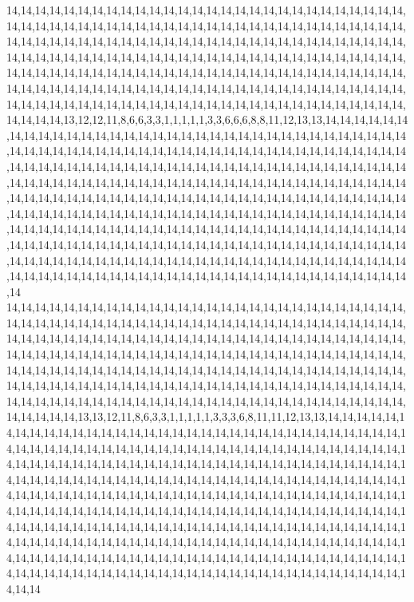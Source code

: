 14,14,14,14,14,14,14,14,14,14,14,14,14,14,14,14,14,14,14,14,14,14,14,14,14,14,14,14,14,14,14,14,14,14,14,14,14,14,14,14,14,14,14,14,14,14,14,14,14,14,14,14,14,14,14,14,14,14,14,14,14,14,14,14,14,14,14,14,14,14,14,14,14,14,14,14,14,14,14,14,14,14,14,14,14,14,14,14,14,14,14,14,14,14,14,14,14,14,14,14,14,14,14,14,14,14,14,14,14,14,14,14,14,14,14,14,14,14,14,14,14,14,14,14,14,14,14,14,14,14,14,14,14,14,14,14,14,14,14,14,14,14,14,14,14,14,14,14,14,14,14,14,14,14,14,14,14,14,14,14,14,14,14,14,14,14,14,14,14,14,14,14,14,14,14,14,14,14,14,14,14,14,14,14,14,14,14,14,14,14,14,14,14,14,14,14,14,14,14,14,13,12,12,11,8,6,6,3,3,1,1,1,1,1,3,3,6,6,6,8,8,11,12,13,13,14,14,14,14,14,14,14,14,14,14,14,14,14,14,14,14,14,14,14,14,14,14,14,14,14,14,14,14,14,14,14,14,14,14,14,14,14,14,14,14,14,14,14,14,14,14,14,14,14,14,14,14,14,14,14,14,14,14,14,14,14,14,14,14,14,14,14,14,14,14,14,14,14,14,14,14,14,14,14,14,14,14,14,14,14,14,14,14,14,14,14,14,14,14,14,14,14,14,14,14,14,14,14,14,14,14,14,14,14,14,14,14,14,14,14,14,14,14,14,14,14,14,14,14,14,14,14,14,14,14,14,14,14,14,14,14,14,14,14,14,14,14,14,14,14,14,14,14,14,14,14,14,14,14,14,14,14,14,14,14,14,14,14,14,14,14,14,14,14,14,14,14,14,14,14,14,14,14,14,14,14,14,14,14,14,14,14,14,14,14,14,14,14,14,14,14,14,14,14,14,14,14,14,14,14,14,14,14,14,14,14,14,14,14,14,14,14,14,14,14,14,14,14,14,14,14,14,14,14,14,14,14,14,14,14,14,14,14,14,14,14,14,14,14,14,14,14,14,14,14,14,14,14,14,14,14,14,14,14,14,14,14,14,14,14,14,14,14,14,14,14,14,14,14,14,14,14,14,14,14,14,14,14,14,14,14,14
14,14,14,14,14,14,14,14,14,14,14,14,14,14,14,14,14,14,14,14,14,14,14,14,14,14,14,14,14,14,14,14,14,14,14,14,14,14,14,14,14,14,14,14,14,14,14,14,14,14,14,14,14,14,14,14,14,14,14,14,14,14,14,14,14,14,14,14,14,14,14,14,14,14,14,14,14,14,14,14,14,14,14,14,14,14,14,14,14,14,14,14,14,14,14,14,14,14,14,14,14,14,14,14,14,14,14,14,14,14,14,14,14,14,14,14,14,14,14,14,14,14,14,14,14,14,14,14,14,14,14,14,14,14,14,14,14,14,14,14,14,14,14,14,14,14,14,14,14,14,14,14,14,14,14,14,14,14,14,14,14,14,14,14,14,14,14,14,14,14,14,14,14,14,14,14,14,14,14,14,14,14,14,14,14,14,14,14,14,14,14,14,14,14,14,14,14,14,14,14,14,13,13,12,11,8,6,3,3,1,1,1,1,1,3,3,3,6,8,11,11,12,13,13,14,14,14,14,14,14,14,14,14,14,14,14,14,14,14,14,14,14,14,14,14,14,14,14,14,14,14,14,14,14,14,14,14,14,14,14,14,14,14,14,14,14,14,14,14,14,14,14,14,14,14,14,14,14,14,14,14,14,14,14,14,14,14,14,14,14,14,14,14,14,14,14,14,14,14,14,14,14,14,14,14,14,14,14,14,14,14,14,14,14,14,14,14,14,14,14,14,14,14,14,14,14,14,14,14,14,14,14,14,14,14,14,14,14,14,14,14,14,14,14,14,14,14,14,14,14,14,14,14,14,14,14,14,14,14,14,14,14,14,14,14,14,14,14,14,14,14,14,14,14,14,14,14,14,14,14,14,14,14,14,14,14,14,14,14,14,14,14,14,14,14,14,14,14,14,14,14,14,14,14,14,14,14,14,14,14,14,14,14,14,14,14,14,14,14,14,14,14,14,14,14,14,14,14,14,14,14,14,14,14,14,14,14,14,14,14,14,14,14,14,14,14,14,14,14,14,14,14,14,14,14,14,14,14,14,14,14,14,14,14,14,14,14,14,14,14,14,14,14,14,14,14,14,14,14,14,14,14,14,14,14,14,14,14,14,14,14,14,14,14,14,14,14,14,14,14,14,14,14,14,14,14,14,14,14,14,14,14

